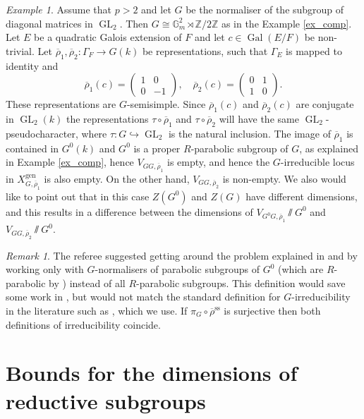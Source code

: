 \documentclass{amsart}
\theoremstyle{definition}
\theoremstyle{remark}
\newtheorem{examp}[prop]{Example}
\newtheorem{remar}[prop]{Remark}
\DeclareMathOperator{\GL}{GL}
\DeclareMathOperator{\Gal}{Gal}
\newcommand{\ZZ}{\mathbb Z}
\newcommand{\rhobar}{\overline{\rho}}
\newcommand{\Gm}{\mathbb G_{m}}
\newcommand{\gen}{\mathrm{gen}}
\newcommand{\rhobarss}{\rhobar^{\mathrm{ss}}}
\begin{document}
\begin{examp}\label{ex_bad_def} Assume that $p>2$ and let $G$ be the normaliser of the subgroup of diagonal matrices in $\GL_2$. Then 
$G\cong \Gm^2\rtimes \ZZ/2\ZZ$ as in the Example \ref{ex_comp}. Let $E$ be a quadratic Galois extension 
of $F$ and let $c\in \Gal(E/F)$ be non-trivial. Let $\rhobar_1, \rhobar_2: \Gamma_F \rightarrow G(k)$ be 
representations, such that $\Gamma_E$ is mapped to identity and 
$$\rhobar_1(c)= \begin{pmatrix} 1 & 0 \\ 0 & -1\end{pmatrix}, \quad \rhobar_2(c)= \begin{pmatrix} 0 & 1\\ 1 & 0 \end{pmatrix}.$$
These representations are $G$-semisimple. 
Since $\rhobar_1(c)$ and $\rhobar_2(c)$ are conjugate in $\GL_2(k)$ the representations $\tau\circ \rhobar_1$ 
and $\tau\circ \rhobar_2$ will have the same $\GL_2$-pseudocharacter, where $\tau: G\hookrightarrow \GL_2$ is
the natural inclusion. The image of $\rhobar_1$ is contained
in $G^0(k)$ and $G^0$ is a proper $R$-parabolic subgroup of $G$, as explained in Example \ref{ex_comp}, hence 
$V_{GG, \rhobar_1}$ is empty, and hence the $G$-irreducible locus in $X^{\gen}_{G, \rhobar_1}$ is also empty. 
On the other hand, $V_{GG, \rhobar_2}$ is non-empty. We also would like to point out that in this 
case $Z(G^0)$ and $Z(G)$ have different dimensions, and this results in a difference between the dimensions
of $V_{G^0G, \rhobar_1}\sslash G^0$ and  $V_{GG, \rhobar_2}\sslash G^0$.
\end{examp}

\begin{remar} The referee suggested  getting around the problem 
explained in  and  by working only with $G$-normalisers of parabolic subgroups of $G^0$ (which are $R$-parabolic by \cite[Proposition 6.1]{BMR}) instead of all $R$-parabolic subgroups. This definition would
save some work in , but would not match the standard definition for $G$-irreducibility in the literature such as \cite{BMR}, which we use. If $\pi_G \circ \rhobarss$ is surjective then both definitions of irreducibility coincide. 
\end{remar} 


 \section{Bounds for the dimensions of reductive subgroups}\label{bounds_red_sbgp}
\end{document}
